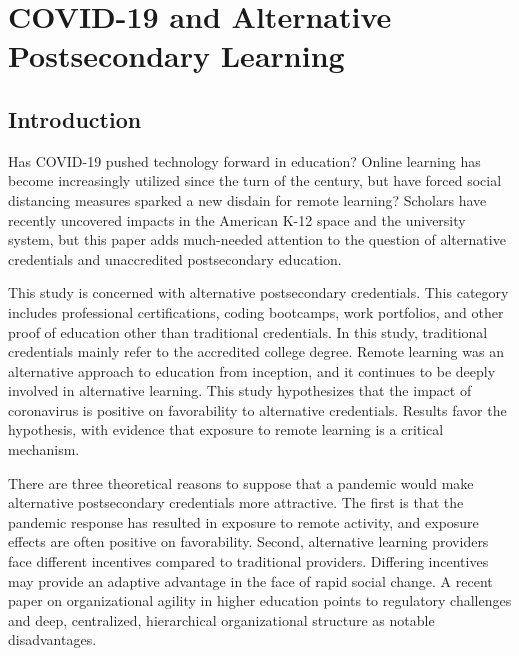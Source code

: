 
\chapter[COVID-19 and Alternative Postsecondary Learning]{COVID-19 and Alternative Postsecondary Learning}

\section{Introduction}

Has COVID-19 pushed technology forward in education?
Online learning has become increasingly utilized since the turn of the century,
but have forced social distancing measures sparked a new disdain for remote learning?
Scholars have recently uncovered impacts in the American K-12 space and the university system,
but this paper adds much-needed attention to the question of alternative credentials
and unaccredited postsecondary education.

This study is concerned with alternative postsecondary credentials.
This category includes professional certifications, coding bootcamps, work portfolios,
and other proof of education other than traditional credentials.
In this study, traditional credentials mainly refer to the accredited college degree.
Remote learning was an alternative approach to education from inception, and it continues to be deeply involved in alternative learning.
This study hypothesizes that the impact of coronavirus is positive on favorability to alternative credentials.
Results favor the hypothesis, with evidence that exposure to remote learning is a critical mechanism.

There are three theoretical reasons to suppose that a pandemic would make alternative postsecondary credentials more attractive.
The first is that the pandemic response has resulted in exposure to remote activity,
and exposure effects are often positive on favorability.
Second, alternative learning providers face different incentives compared to traditional providers.
Differing incentives may provide an adaptive advantage in the face of rapid social change.
A recent paper on organizational agility in higher education points to regulatory challenges
and deep, centralized, hierarchical organizational structure as notable disadvantages\cite{menon2020factors}.

